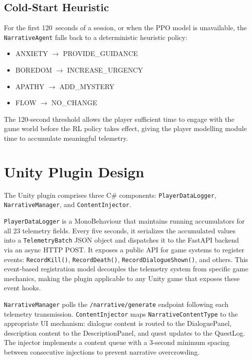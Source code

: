\documentclass[12pt,a4paper]{report}
\begin{document}
\subsection{Cold-Start Heuristic}

For the first 120~seconds of a session, or when the PPO model is unavailable, the \texttt{NarrativeAgent} falls back to a deterministic heuristic policy:

\begin{itemize}
\item ANXIETY $\rightarrow$ PROVIDE\_GUIDANCE
\item BOREDOM $\rightarrow$ INCREASE\_URGENCY
\item APATHY $\rightarrow$ ADD\_MYSTERY
\item FLOW $\rightarrow$ NO\_CHANGE
\end{itemize}

The 120-second threshold allows the player sufficient time to engage with the game world before the RL policy takes effect, giving the player modelling module time to accumulate meaningful telemetry.

\section{Unity Plugin Design}

The Unity plugin comprises three C\# components: \texttt{PlayerDataLogger}, \texttt{NarrativeManager}, and \texttt{ContentInjector}.

\texttt{PlayerDataLogger} is a MonoBehaviour that maintains running accumulators for all 23 telemetry fields. Every five seconds, it serializes the accumulated values into a \texttt{TelemetryBatch} JSON object and dispatches it to the FastAPI backend via an async HTTP POST. It exposes a public API for game systems to register events: \texttt{RecordKill()}, \texttt{RecordDeath()}, \texttt{RecordDialogueShown()}, and others. This event-based registration model decouples the telemetry system from specific game mechanics, making the plugin applicable to any Unity game that exposes these event hooks.

\texttt{NarrativeManager} polls the \texttt{/narrative/generate} endpoint following each telemetry transmission. \texttt{ContentInjector} maps \texttt{NarrativeContentType} to the appropriate UI mechanism: dialogue content is routed to the DialoguePanel, description content to the DescriptionPanel, and quest updates to the QuestLog. The injector implements a content queue with a 3-second minimum spacing between consecutive injections to prevent narrative overcrowding.
\end{document}
